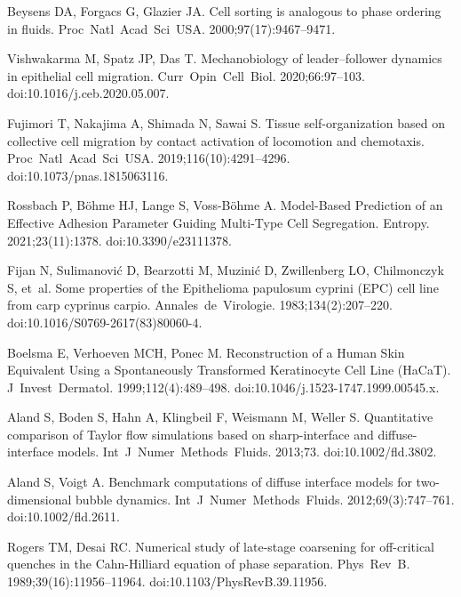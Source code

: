 \documentclass[10pt,letterpaper]{article}
\begin{document}
\begin{thebibliography}{10}
Beysens DA, Forgacs G, Glazier JA.
\newblock Cell sorting is analogous to phase ordering in fluids.
\newblock Proc~Natl~Acad~Sci~USA. 2000;97(17):9467--9471.

Vishwakarma M, Spatz JP, Das T.
\newblock Mechanobiology of leader–follower dynamics in epithelial cell
  migration.
\newblock Curr~Opin~Cell~Biol. 2020;66:97--103.
\newblock doi:{10.1016/j.ceb.2020.05.007}.

Fujimori T, Nakajima A, Shimada N, Sawai S.
\newblock Tissue self-organization based on collective cell migration by
  contact activation of locomotion and chemotaxis.
\newblock Proc~Natl~Acad~Sci~USA. 2019;116(10):4291--4296.
\newblock doi:{10.1073/pnas.1815063116}.

Rossbach P, B\"ohme HJ, Lange S, Voss-B\"ohme A.
\newblock Model-{Based} {Prediction} of an {Effective} {Adhesion} {Parameter}
  {Guiding} {Multi}-{Type} {Cell} {Segregation}.
\newblock Entropy. 2021;23(11):1378.
\newblock doi:{10.3390/e23111378}.

Fijan N, Sulimanovi\'{c} D, Bearzotti M, Muzini\'{c} D, Zwillenberg LO,
  Chilmonczyk S, et~al.
\newblock Some properties of the Epithelioma papulosum cyprini ({EPC}) cell
  line from carp cyprinus carpio.
\newblock Annales~de~Virologie. 1983;134(2):207--220.
\newblock doi:{10.1016/S0769-2617(83)80060-4}.

Boelsma E, Verhoeven MCH, Ponec M.
\newblock Reconstruction of a Human Skin Equivalent Using a Spontaneously
  Transformed Keratinocyte Cell Line ({HaCaT}).
\newblock J~Invest~Dermatol. 1999;112(4):489--498.
\newblock doi:{10.1046/j.1523-1747.1999.00545.x}.

Aland S, Boden S, Hahn A, Klingbeil F, Weismann M, Weller S.
\newblock Quantitative comparison of {Taylor} flow simulations based on
  sharp-interface and diffuse-interface models.
\newblock Int~J~Numer~Methods~Fluids. 2013;73.
\newblock doi:{10.1002/fld.3802}.

Aland S, Voigt A.
\newblock Benchmark computations of diffuse interface models for
  two-dimensional bubble dynamics.
\newblock Int~J~Numer~Methods~Fluids. 2012;69(3):747--761.
\newblock doi:{10.1002/fld.2611}.

Rogers TM, Desai RC.
\newblock Numerical study of late-stage coarsening for off-critical quenches in
  the {Cahn}-{Hilliard} equation of phase separation.
\newblock Phys~Rev~B. 1989;39(16):11956--11964.
\newblock doi:{10.1103/PhysRevB.39.11956}.


\end{thebibliography}
\end{document}
